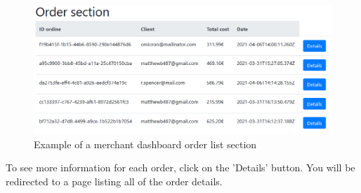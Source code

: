 \begin{figure}[H]
\centering
\includegraphics[scale=0.6]{res/Immagini/MerchantOrderList}
\caption{Example of a merchant dashboard order list section}
\end{figure}

To see more information for each order, click on the 'Details' button. You will be redirected to a page listing all of the order details.
